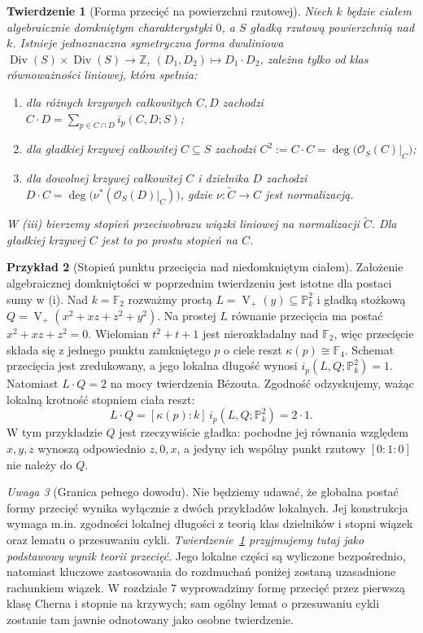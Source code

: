\documentclass[11pt,a4paper,openany]{report}
\numberwithin{equation}{section}
\theoremstyle{plain}
\newtheorem{twierdzenie}{Twierdzenie}[section]
\theoremstyle{definition}
\newtheorem{przyklad}[twierdzenie]{Przykład}
\theoremstyle{remark}
\newtheorem{uwaga}[twierdzenie]{Uwaga}
\newcommand{\Z}{\mathbb Z}
\newcommand{\PP}{\mathbb P}
\newcommand{\V}{\operatorname V}
\begin{document}
\begin{twierdzenie}[Forma przecięć na powierzchni rzutowej]
\label{tw:ga6-intersection-global}
Niech $k$ będzie ciałem algebraicznie domkniętym
charakterystyki $0$, a $S$ gładką rzutową powierzchnią
nad $k$. Istnieje jednoznaczna symetryczna forma dwuliniowa
$\operatorname{Div}(S)\times\operatorname{Div}(S)\to\Z$,
$(D_1,D_2)\mapsto D_1\cdot D_2$, zależna tylko od klas
równoważności liniowej, która spełnia:
\begin{enumerate}[label=(\roman*)]
\item dla różnych krzywych całkowitych $C,D$ zachodzi
$C\cdot D=\sum_{p\in C\cap D}i_p(C,D;S)$;
\item dla gładkiej krzywej całkowitej $C\subseteq S$
zachodzi $C^2:=C\cdot C=\deg\bigl(\mathcal O_S(C)|_C\bigr)$;
\item dla dowolnej krzywej całkowitej $C$ i dzielnika $D$
zachodzi $D\cdot C=\deg\bigl(\nu^*(\mathcal O_S(D)|_C)\bigr)$,
gdzie $\nu:\widetilde C\to C$ jest normalizacją.
\end{enumerate}
W (iii) bierzemy stopień przeciwobrazu wiązki liniowej
na normalizacji $\widetilde C$. Dla gładkiej krzywej $C$
jest to po prostu stopień na $C$.
\end{twierdzenie}

\begin{przyklad}[Stopień punktu przecięcia nad niedomkniętym ciałem]
Założenie algebraicznej domkniętości w poprzednim
twierdzeniu jest istotne dla postaci sumy w (i).
Nad $k=\mathbb F_2$ rozważmy prostą
$L=\V_+(y)\subseteq\PP^2_k$ i gładką stożkową
$Q=\V_+(x^2+xz+z^2+y^2)$.
Na prostej $L$ równanie przecięcia ma postać
$x^2+xz+z^2=0$. Wielomian $t^2+t+1$ jest
nierozkładalny nad $\mathbb F_2$, więc przecięcie
składa się z jednego punktu zamkniętego $p$
o ciele reszt $\kappa(p)\cong\mathbb F_4$.
Schemat przecięcia jest zredukowany, a jego lokalna
długość wynosi $i_p(L,Q;\PP^2_k)=1$.
Natomiast $L\cdot Q=2$ na mocy twierdzenia Bézouta.
Zgodność odzyskujemy, ważąc lokalną krotność stopniem
ciała reszt:
\[
  L\cdot Q=[\kappa(p):k]\,i_p(L,Q;\PP^2_k)=2\cdot1.
\]
W tym przykładzie $Q$ jest rzeczywiście gładka:
pochodne jej równania względem $x,y,z$
wynoszą odpowiednio $z,0,x$, a jedyny ich
wspólny punkt rzutowy $[0:1:0]$ nie należy do $Q$.
\end{przyklad}

\begin{uwaga}[Granica pełnego dowodu]
Nie będziemy udawać, że globalna postać formy przecięć
wynika wyłącznie z dwóch przykładów lokalnych. Jej konstrukcja
wymaga m.in. zgodności lokalnej długości z teorią klas dzielników
i stopni wiązek oraz lematu o przesuwaniu cykli.
\emph{Twierdzenie~\ref{tw:ga6-intersection-global} przyjmujemy tutaj
jako podstawowy wynik teorii przecięć}. Jego lokalne części
są wyliczone bezpośrednio, natomiast kluczowe zastosowania
do rozdmuchań poniżej zostaną uzasadnione rachunkiem wiązek.
W rozdziale 7 wyprowadzimy formę przecięć przez
pierwszą klasę Cherna i stopnie na krzywych;
sam ogólny lemat o przesuwaniu cykli zostanie tam jawnie
odnotowany jako osobne twierdzenie.
\end{uwaga}
\end{document}

